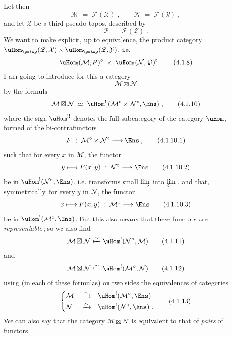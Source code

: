 Let then
\[
\mathcal{M} \;=\; \mathcal{F}(\mathcal{X})\;, \qquad \mathcal{N} \;=\; \mathcal{F}(\mathcal{Y})\;,
\tag*{(4.1.6)}
\]
and let $\mathcal{Z}$ be a third pseudo-topos, described by
\[
\mathcal{P} \;=\; \mathcal{F}(\mathcal{Z})\;.
\tag*{(4.1.7)}
\]
We want to make explicit, up to equivalence, the product category $\uHom_{\pstop}(\mathcal{Z},\mathcal{X})\times\uHom_{\pstop}(\mathcal{Z},\mathcal{Y})$, i.e.
\[
\uHom_!(\mathcal{M},\mathcal{P})^\circ \;\times\; \uHom_!(\mathcal{N},\mathcal{Q})^\circ.
\tag*{(4.1.8)}
\] %
I am going to introduce for this a category
\[
\mathcal{M}\boxtimes\mathcal{N}
\tag*{(4.1.9)}
\]
by the formula
\[
\mathcal{M}\boxtimes\mathcal{N} \;\simeq\; \uHom^{!!}(\mathcal{M}^\circ\times\mathcal{N}^\circ,\Ens)\;,
\tag*{(4.1.10)}
\]
where the sign $\uHom^{!!}$ denotes the full subcategory of the category $\uHom$, formed of the bi-contrafunctors %
\[
F \;:\; \mathcal{M}^\circ\times\mathcal{N}^\circ \longrightarrow \Ens\;,
\tag*{(4.1.10.1)}
\]
such that for every $x$ in $\mathcal{M}$, the functor
\[
y \longmapsto F(x,y) \;:\; \mathcal{N}^\circ \longrightarrow \Ens
\tag*{(4.1.10.2)}
\]
be in $\uHom^!(\mathcal{N}^\circ,\Ens)$, i.e. transforms small $\varinjlim$ into $\varprojlim$\,, and that, symmetrically, for every $y$ in $\mathcal{N}$, the functor
\[
x \longmapsto F(x,y) \;:\; \mathcal{M}^\circ \longrightarrow \Ens
\tag*{(4.1.10.3)}
\]
be in $\uHom^!(\mathcal{M}^\circ,\Ens)$. But this also means that these functors are \textit{representable}\,; so we also find
\[
\mathcal{M}\boxtimes\mathcal{N} \xleftarrow{\sim} \uHom^!(\mathcal{N}^\circ,\mathcal{M})
\tag*{(4.1.11)}
\]
and
\[
\mathcal{M}\boxtimes\mathcal{N} \xleftarrow{\sim} \uHom^!(\mathcal{M}^\circ,\mathcal{N})
\tag*{(4.1.12)}
\]
using (in each of these formulas) on two sides the equivalences of categories
\[
\left\{
\begin{aligned}
&\mathcal{M} &&\xrightarrow{\sim} &&\uHom^!(\mathcal{M}^\circ,\Ens)\\
&\mathcal{N} &&\xrightarrow{\sim} &&\uHom^!(\mathcal{N}^\circ,\Ens)\;.
\end{aligned}
\right.
\tag*{(4.1.13)}
\]
We can also say that the category $\mathcal{M}\boxtimes\mathcal{N}$ is equivalent to that of \textit{pairs} of functors
